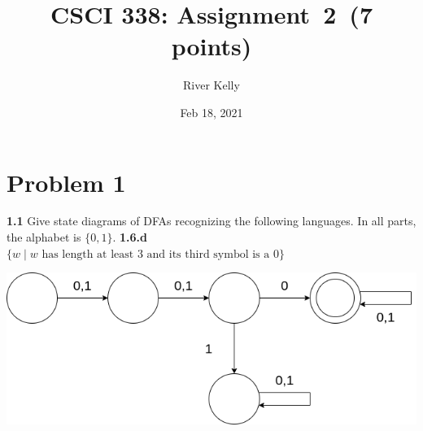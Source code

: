 \documentclass[11pt]{article}
\title{CSCI 338: Assignment~2~(7 points)}
\author{River Kelly}
\date{Feb 18, 2021}
\begin{document}
\maketitle

\newpage
\section*{Problem 1}
\noindent
\textbf{1.1} Give state diagrams of DFAs recognizing the following languages. In all parts, the alphabet is $\{0,1\}$.
\newline
\newline
\textbf{1.6.d} 
\newline
$\{w \mid w \text{ has length at least 3 and its third symbol is a } 0\}$
\begin{center}
\includegraphics[scale=0.5]{02/HW02-1.6.d.png}    
\end{center}
\end{document}
